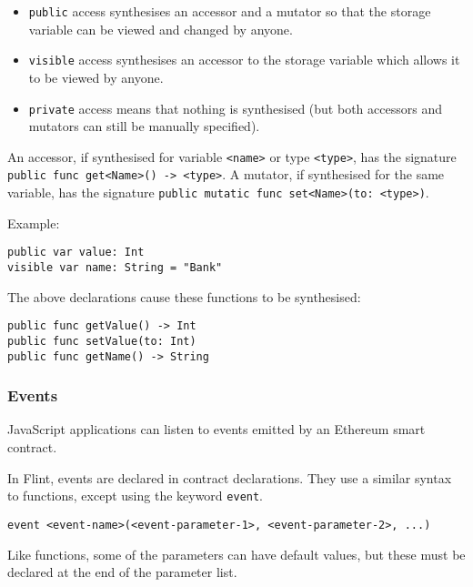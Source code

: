 \begin{itemize}
	\item \texttt{public} access synthesises an accessor and a mutator so that the storage variable can be viewed and changed by anyone.
	\item \texttt{visible} access synthesises an accessor to the storage variable which allows it to be viewed by anyone.
	\item \texttt{private} access means that nothing is synthesised (but both accessors and mutators can still be manually specified).
\end{itemize}

An accessor, if synthesised for variable \texttt{<name>} or type \texttt{<type>}, has the signature \texttt{public func get<Name>() -> <type>}. A mutator, if synthesised for the same variable, has the signature \texttt{public mutatic func set<Name>(to: <type>)}.

Example:

\begin{verbatim}
public var value: Int
visible var name: String = "Bank"
\end{verbatim}

The above declarations cause these functions to be synthesised:

\begin{verbatim}
public func getValue() -> Int
public func setValue(to: Int)
public func getName() -> String
\end{verbatim}

\subsubsection{Events}
\label{sec:appendix-b-events}

JavaScript applications can listen to events emitted by an Ethereum smart contract.

In Flint, events are declared in contract declarations. They use a similar syntax to functions, except using the keyword \texttt{event}.

\begin{verbatim}
event <event-name>(<event-parameter-1>, <event-parameter-2>, ...)
\end{verbatim}

Like functions, some of the parameters can have default values, but these must be declared at the end of the parameter list.

